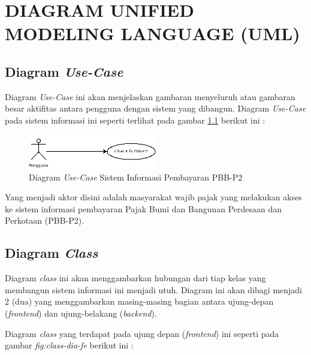\chapter{DIAGRAM UNIFIED MODELING LANGUAGE (UML)}

\section{Diagram \textit{Use-Case}}

Diagram \textit{Use-Case} ini akan menjelaskan gambaran menyeluruh atau gambaran besar aktifitas antara pengguna dengan sistem yang dibangun. Diagram \textit{Use-Case} pada sistem informasi ini seperti terlihat pada gambar \ref{fig:use-case} berikut ini :

\begin{figure}[H]
	\centering
	\includegraphics[width=0.5\textwidth]{./resources/uml/use-case-diag}
	\caption{Diagram \textit{Use-Case} Sistem Informasi Pembayaran PBB-P2}
	\label{fig:use-case}
\end{figure}

Yang menjadi aktor disini adalah masyarakat wajib pajak yang melakukan akses ke sistem informasi pembayaran Pajak Bumi dan Bangunan Perdesaan dan Perkotaan (PBB-P2).

\section{Diagram \textit{Class}}

Diagram \textit{class} ini akan menggambarkan hubungan dari tiap kelas yang membangun sistem informasi ini menjadi utuh. Diagram ini akan dibagi menjadi 2 (dua) yang menggambarkan masing-masing bagian antara ujung-depan (\textit{frontend}) dan ujung-belakang (\textit{backend}).

Diagram \textit{class} yang terdapat pada ujung depan (\textit{frontend}) ini seperti pada gambar \textit{fig:class-dia-fe} berikut ini :

